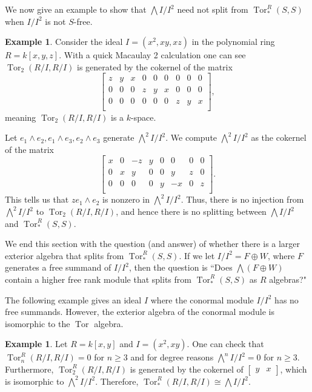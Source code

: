 \documentclass{amsart}
\theoremstyle{definition}
\newtheorem{ex}[theorem]{Example}
\theoremstyle{remark}
\newcommand{\Tor}{\ensuremath{\operatorname{Tor}}}
\begin{document}
We now give an example to show that $\bigwedge I/I^2$ need not split from $\Tor^{R}_*(S,S)$ when $I/I^2$ is not $S$-free. 

\begin{ex}
    Consider the ideal $I=(x^2,xy,xz)$ in the polynomial ring $R=k[x,y,z]$. With a quick Macaulay 2 calculation one can see $\Tor_2(R/I,R/I)$ is generated by the cokernel of the matrix 
 \[   \begin{bmatrix}
        z & y & x & 0 & 0 & 0 & 0 & 0 & 0\\
        0 & 0 & 0 & z & y & x& 0 & 0 & 0 \\
        0 & 0 & 0 & 0 & 0 & 0 & z & y & x \\
    \end{bmatrix},
 \]
    meaning $\Tor_2(R/I,R/I)$ is a $k$-space.

Let $e_1\wedge e_2 , e_1\wedge e_3, e_2\wedge e_3$ generate $\bigwedge^2 I/I^2$. We compute $\bigwedge^2 I/I^2$ as the cokernel of the matrix
 \[   \begin{bmatrix}
        x & 0 & -z & y & 0 & 0 & 0 & 0 \\
        0 & x & y & 0 & 0 & y& z & 0  \\
        0 & 0 & 0 & 0 & y & -x & 0 & z  \\
    \end{bmatrix}.
 \]
This tells us that $ze_1\wedge e_2$ is nonzero in $\bigwedge^2 I/I^2$. Thus, there is no injection from $\bigwedge^2 I/I^2$ to $\Tor_2(R/I,R/I)$, and hence there is no splitting between $\bigwedge I/I^2$ and $\Tor_*^{R}(S,S)$.\end{ex}






We end this section with the question (and answer) of whether there is a larger exterior algebra that splits from $\Tor_{*}^{R}(S,S)$. If we let $I/I^2= F \oplus W$, where $F$ generates a free summand of $I/I^2$, then the question is ``Does $\bigwedge (F \oplus W)$ contain a higher free rank module that splits from $\Tor^{R}_{*}(S,S)$ as $R$ algebras?" 

The following example gives an ideal $I$ where the conormal module $I/I^2$ has no free summands. However, the exterior algebra of the conormal module is isomorphic to the $\Tor$ algebra.

\begin{ex}
    Let $R=k[x,y]$ and $I=(x^2,xy)$. One can check that $\Tor_{n}^{R}(R/I,R/I)=0$ for $n\geq 3$ and for degree reasons $\bigwedge^nI/I^2 =0$ for $n\geq 3$. Furthermore, $\Tor_2^{R}(R/I,R/I)$ is generated by the cokernel of $\begin{bmatrix}
        y & x
    \end{bmatrix}$, which is isomorphic to $\bigwedge^2 I/I^2$. Therefore, $\Tor_{*}^{R}(R/I,R/I) \cong \bigwedge I/I^2$.
\end{ex}
\end{document}
